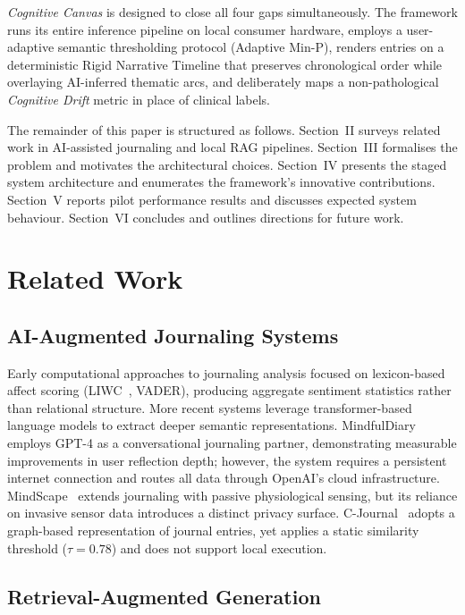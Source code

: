 \documentclass[12pt, letterpaper]{article}
\newcommand{\CC}{\textit{Cognitive Canvas}}
\begin{document}
\CC{} is designed to close all four gaps simultaneously.
The framework runs its entire inference pipeline on local
consumer hardware, employs a user-adaptive semantic
thresholding protocol (Adaptive Min-P), renders entries on a
deterministic Rigid Narrative Timeline that preserves
chronological order while overlaying AI-inferred thematic arcs,
and deliberately maps a non-pathological \emph{Cognitive Drift}
metric in place of clinical labels.

The remainder of this paper is structured as follows.
Section~II surveys related work in AI-assisted journaling and
local RAG pipelines.
Section~III formalises the problem and motivates the
architectural choices.
Section~IV presents the staged system architecture and
enumerates the framework's innovative contributions.
Section~V reports pilot performance results and discusses
expected system behaviour.
Section~VI concludes and outlines directions for future work.

\section{Related Work}

\subsection{AI-Augmented Journaling Systems}

Early computational approaches to journaling analysis focused
on lexicon-based affect scoring
(LIWC~\cite{pennebaker2003liwc}, VADER), producing aggregate
sentiment statistics rather than relational structure.
More recent systems leverage transformer-based language models
to extract deeper semantic representations.
MindfulDiary~\cite{xu2023mindfuldiary} employs GPT-4 as a
conversational journaling partner, demonstrating measurable
improvements in user reflection depth; however, the system
requires a persistent internet connection and routes all data
through OpenAI's cloud infrastructure.
MindScape~\cite{mindscape} extends journaling with passive
physiological sensing, but its reliance on invasive sensor
data introduces a distinct privacy surface.
C-Journal~\cite{cjournal2024} adopts a graph-based
representation of journal entries, yet applies a static
similarity threshold ($\tau = 0.78$) and does not support
local execution.

\subsection{Retrieval-Augmented Generation}
\end{document}
